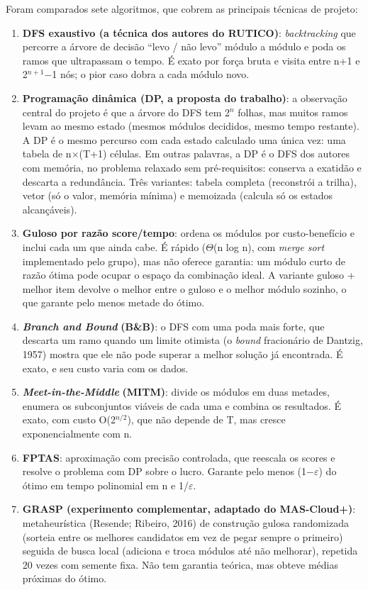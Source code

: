 \documentclass[12pt,a4paper]{article}
\newcommand{\secao}[1]{\par\vspace{1.2em}\noindent{\bfseries #1}\par\vspace{0.8em}\nopagebreak}
\begin{document}
\secao{4 OS ALGORITMOS COMPARADOS}
Foram comparados sete algoritmos, que cobrem as principais técnicas de projeto:

\begin{enumerate}[leftmargin=*,itemsep=0.3em]
\item \textbf{DFS exaustivo (a técnica dos autores do RUTICO)}: \textit{backtracking} que percorre a árvore de decisão ``levo / não levo'' módulo a módulo e poda os ramos que ultrapassam o tempo. É exato por força bruta e visita entre n+1 e 2\ensuremath{^{n+1}}\ensuremath{-}1 nós; o pior caso dobra a cada módulo novo.
\item \textbf{Programação dinâmica (DP, a proposta do trabalho)}: a observação central do projeto é que a árvore do DFS tem 2\ensuremath{^{n}} folhas, mas muitos ramos levam ao mesmo estado (mesmos módulos decididos, mesmo tempo restante). A DP é o mesmo percurso com cada estado calculado uma única vez: uma tabela de n\ensuremath{\times}(T+1) células. Em outras palavras, a DP é o DFS dos autores com memória, no problema relaxado sem pré-requisitos: conserva a exatidão e descarta a redundância. Três variantes: tabela completa (reconstrói a trilha), vetor (só o valor, memória mínima) e memoizada (calcula só os estados alcançáveis).
\item \textbf{Guloso por razão score/tempo}: ordena os módulos por custo-benefício e inclui cada um que ainda cabe. É rápido (\ensuremath{\Theta}(n log n), com \textit{merge sort} implementado pelo grupo), mas não oferece garantia: um módulo curto de razão ótima pode ocupar o espaço da combinação ideal. A variante guloso + melhor item devolve o melhor entre o guloso e o melhor módulo sozinho, o que garante pelo menos metade do ótimo.
\item \textbf{\textit{Branch and Bound}}\textbf{ (B\&B)}: o DFS com uma poda mais forte, que descarta um ramo quando um limite otimista (o \textit{bound} fracionário de Dantzig, 1957) mostra que ele não pode superar a melhor solução já encontrada. É exato, e seu custo varia com os dados.
\item \textbf{\textit{Meet-in-the-Middle}}\textbf{ (MITM)}: divide os módulos em duas metades, enumera os subconjuntos viáveis de cada uma e combina os resultados. É exato, com custo O(2\ensuremath{^{n/2}}), que não depende de T, mas cresce exponencialmente com n.
\item \textbf{FPTAS}: aproximação com precisão controlada, que reescala os scores e resolve o problema com DP sobre o lucro. Garante pelo menos (1\ensuremath{-}\ensuremath{\varepsilon}) do ótimo em tempo polinomial em n e 1/\ensuremath{\varepsilon}.
\item \textbf{GRASP (experimento complementar, adaptado do MAS-Cloud+)}: metaheurística (Resende; Ribeiro, 2016) de construção gulosa randomizada (sorteia entre os melhores candidatos em vez de pegar sempre o primeiro) seguida de busca local (adiciona e troca módulos até não melhorar), repetida 20 vezes com semente fixa. Não tem garantia teórica, mas obteve médias próximas do ótimo.
\end{enumerate}
\end{document}

